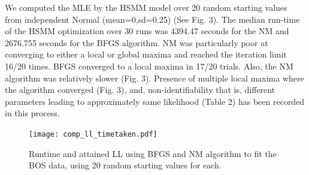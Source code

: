 \documentclass{uwstat572}
\begin{document}
We computed the MLE by the HSMM model over 20 random starting values from independent Normal (mean=0,sd=0.25) (See Fig. 3). The median run-time of the HSMM optimization over 30 runs was 4394.47 seconds for the NM and 2676.755 seconds for the BFGS algorithm. NM was particularly poor at converging to either a local or global maxima and reached the iteration limit 16/20 times. BFGS converged to a local maxima in 17/20 trials. Also, the NM algorithm was relatively slower (Fig. 3). Presence of multiple local maxima where the algorithm converged (Fig. 3), and, non-identifiability that is, different parameters leading to approximately same likelihood (Table 2) has been recorded in this process. 



\begin{table}[t]
\centering
\caption{This is a demonstration of non-identifiability of the likelihood for the BOS dataset. Two different parameter sets lead to approximately the same likelihood.}\vspace{4mm}
\vspace{2mm}
\end{table}
\vspace{3mm}
\begin{figure}[t]\label{fig:comp_ll}
\centering
\texttt{[image: comp\_ll\_timetaken.pdf]}
\caption{Runtime and attained LL using BFGS and NM algorithm to fit the BOS data, using 20 random starting values for each.}
\end{figure}
\end{document}
